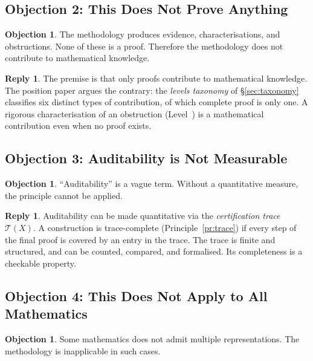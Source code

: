 \documentclass[11pt,a4paper]{article}
\theoremstyle{definition}
\newtheorem{objection}[definition]{Objection}
\newtheorem{reply}[definition]{Reply}
\theoremstyle{plain}
\newcommand{\Tcal}{\mathcal{T}}
\begin{document}
\subsection{Objection 2: This Does Not Prove Anything}

\begin{objection}
The methodology produces evidence, characterisations, and
obstructions. None of these is a proof. Therefore the methodology
does not contribute to mathematical knowledge.
\end{objection}

\begin{reply}
The premise is that only proofs contribute to mathematical
knowledge. The position paper argues the contrary: the \emph{levels
taxonomy} of \S\ref{sec:taxonomy} classifies six distinct types of
contribution, of which complete proof is only one. A rigorous
characterisation of an obstruction (Level~\RomanVI) is a
mathematical contribution even when no proof exists.
\end{reply}

\subsection{Objection 3: Auditability is Not Measurable}

\begin{objection}
``Auditability'' is a vague term. Without a quantitative measure,
the principle cannot be applied.
\end{objection}

\begin{reply}
Auditability can be made quantitative via the \emph{certification
trace} $\Tcal(X)$. A construction is trace-complete (Principle~\ref{pr:trace})
if every step of the final proof is covered by an entry in the
trace. The trace is finite and structured, and can be counted,
compared, and formalised. Its completeness is a checkable property.
\end{reply}

\subsection{Objection 4: This Does Not Apply to All Mathematics}

\begin{objection}
Some mathematics does not admit multiple representations. The
methodology is inapplicable in such cases.
\end{objection}
\end{document}
